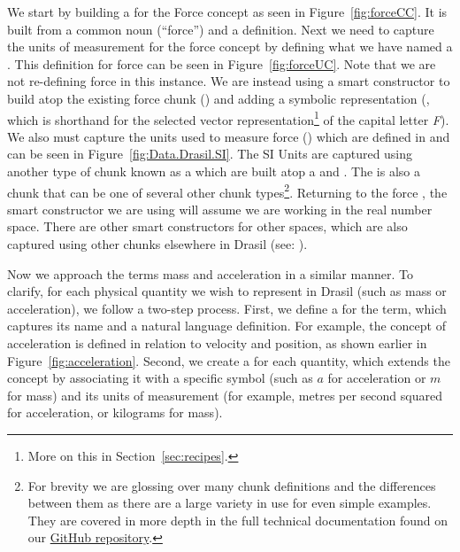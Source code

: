 
We start by building a  for the Force concept as seen in 
Figure~\ref{fig:forceCC}. It is built from a common noun (``force'') and a
definition. Next we need to capture the units of measurement for the force 
concept by defining what we have named a . This definition 
for force can be seen in Figure~\ref{fig:forceUC}. Note that we are not 
re-defining force in this instance. We are instead using a smart constructor to 
build atop the existing force chunk () and adding a symbolic 
representation (, which is shorthand for the selected vector 
representation\footnote{More on this in Section~\ref{sec:recipes}.} of the 
capital letter \emph{F}). We also must capture the units used to measure force
() which are defined in  and can be 
seen in Figure~\ref{fig:Data.Drasil.SI}. The SI Units are captured using 
another type of chunk known as a  which are built atop a 
 and . The  is also a 
chunk that can be one of several other chunk types\footnote{For brevity we are 
glossing over many chunk definitions and the differences between them as there 
are a large variety in use for even simple examples. They are covered in more 
depth in the full technical documentation found on our 
\href{https://www.github.com/jacquescarette/drasil}{GitHub repository}.}. 
Returning to the force , the smart constructor  we 
are using will assume we are working in the real number space. There are 
other smart constructors for other spaces, which are also captured using other 
chunks elsewhere in Drasil (see: ).



Now we approach the terms mass and acceleration in a similar manner. To 
clarify, for each physical quantity we wish to represent in Drasil (such as 
mass or acceleration), we follow a two-step process. First, we define a 
 for the term, which captures its name and a natural 
language definition. For example, the concept of acceleration is defined in 
relation to velocity and position, as shown earlier in 
Figure~\ref{fig:acceleration}. Second, we create a  for each 
quantity, which extends the concept by associating it with a specific symbol 
(such as $a$ for acceleration or $m$ for mass) and its units of measurement 
(for example, metres per second squared for acceleration, or kilograms for 
mass). 

